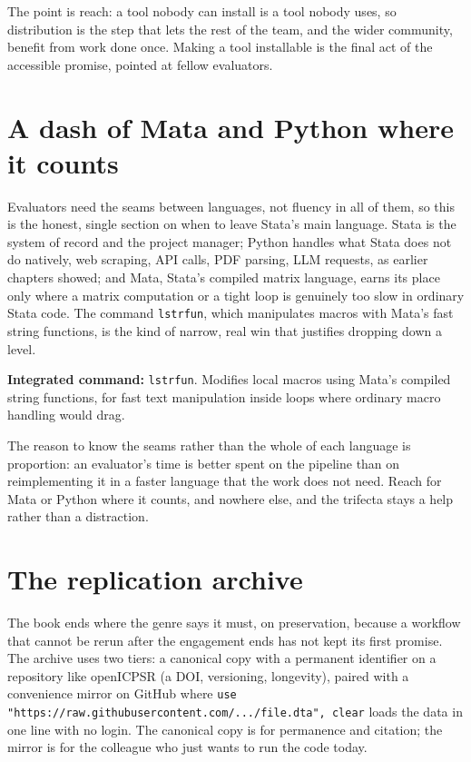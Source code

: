 \documentclass[
    a4paper,
    fontsize=10pt,
    twoside=true,
    numbers=noenddot,
]{kaobook}
\begin{document}
The point is reach: a tool nobody can install is a tool nobody uses, so distribution is the step that lets the rest of the team, and the wider community, benefit from work done once. Making a tool installable is the final act of the accessible promise, pointed at fellow evaluators.

\section{A dash of Mata and Python where it counts}
Evaluators need the seams between languages, not fluency in all of them, so this is the honest, single section on when to leave Stata's main language. Stata is the system of record and the project manager; Python handles what Stata does not do natively, web scraping, API calls, PDF parsing, LLM requests, as earlier chapters showed; and Mata, Stata's compiled matrix language, earns its place only where a matrix computation or a tight loop is genuinely too slow in ordinary Stata code. The command \texttt{lstrfun}, which manipulates macros with Mata's fast string functions, is the kind of narrow, real win that justifies dropping down a level.

\begin{kaobox}[frametitle=Package Integration: \texttt{lstrfun}]
\textbf{Integrated command:} \texttt{lstrfun}. Modifies local macros using Mata's compiled string functions, for fast text manipulation inside loops where ordinary macro handling would drag.
\end{kaobox}

The reason to know the seams rather than the whole of each language is proportion: an evaluator's time is better spent on the pipeline than on reimplementing it in a faster language that the work does not need. Reach for Mata or Python where it counts, and nowhere else, and the trifecta stays a help rather than a distraction.

\section{The replication archive}\label{sec:archive}
The book ends where the genre says it must, on preservation, because a workflow that cannot be rerun after the engagement ends has not kept its first promise. The archive uses two tiers: a canonical copy with a permanent identifier on a repository like openICPSR (a DOI, versioning, longevity), paired with a convenience mirror on GitHub where \texttt{use "https://raw.githubusercontent.com/.../file.dta", clear} loads the data in one line with no login. The canonical copy is for permanence and citation; the mirror is for the colleague who just wants to run the code today.
\end{document}
